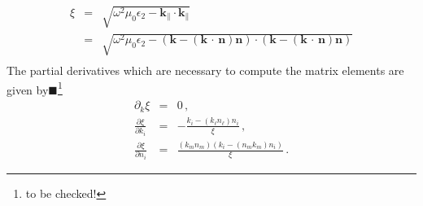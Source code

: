 \documentclass[12pt,a4paper,twoside,openright,BCOR10mm,headsepline,titlepage,abstracton,chapterprefix,final]{scrreprt}
\newcommand\Vector[1]{{\mathbf{#1}}}
\newcommand\vacuum{0}
\newcommand\wavenumber{k}
\newcommand\Wavevector{\Vector{\wavenumber}}
\newcommand{\scpm}[2]{(#1\,\cdot\,#2)}
\newcommand\vacuumpermeability{\mu_{\vacuum}}
\newcommand\scalarpermittivity{\epsilon}
\newcommand{\remark}[1]{{\color{red}$\blacksquare$}\footnote{{\color{red}#1}}}
\begin{document}
\begin{eqnarray}
 \xi &=& \sqrt{\omega^2 \vacuumpermeability \scalarpermittivity_2 - \Wavevector_{\parallel} \cdot \Wavevector_{\parallel}} \nonumber\\
      &=& \sqrt{\omega^2 \vacuumpermeability \scalarpermittivity_2 - (\Wavevector - \scpm{\Wavevector}{\Vector{n}}\Vector{n}) \cdot (\Wavevector - \scpm{\Wavevector}{\Vector{n}}\Vector{n})}\\
\end{eqnarray}
The partial derivatives which are necessary to compute the matrix elements are given by\remark{to be checked!}
\begin{eqnarray}
 \partial_k \xi &=& 0\,,\\
 \frac{\partial \xi}{\partial k_i} &=& -\frac{k_i - (k_\ell n_\ell) n_i}{\xi}\,,\\
 \frac{\partial \xi}{\partial n_i} &=& \frac{(k_m n_m) (k_i - (n_m k_m) n_i)}{\xi}\,.
\end{eqnarray}
\end{document}
